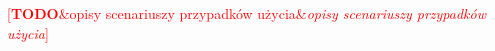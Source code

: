 \documentclass[english,engineering]{wizthesis}
\newcommand{\todo}[1]{%
  \textcolor{red}{[\textbf{TODO}\ifx&#1&{}\else{ }\fi\emph{#1}]}%
}
\begin{document}
\todo{opisy scenariuszy przypadków użycia}

\end{document}
